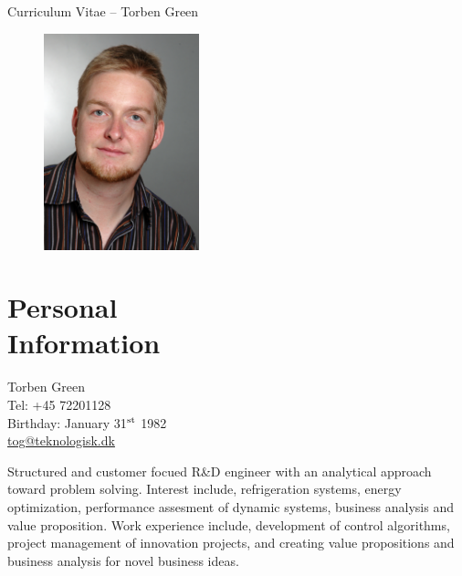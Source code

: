 \documentclass[margin,line,a4paper]{resume}
\begin{document}
{\sc \Large Curriculum Vitae -- Torben Green}
\begin{resume}
    \vspace{0.5cm}
    \begin{figure}
      \vspace{-1cm}
      \begin{center}
        \includegraphics[width=0.4\textwidth]{me}
      \end{center}
      \vspace{-1cm}
    \end{figure}

    \section{\mysidestyle Personal\\Information}%
    Torben Green \\
    Tel: +45 72201128 \\
    Birthday: January 31$^{\rm st}$ 1982\\
    \href{mailto:tog@teknologisk.dk}{tog@teknologisk.dk}

Structured and customer focued R\&D engineer with an analytical approach toward problem solving. Interest include, refrigeration systems, energy optimization, performance assesment of dynamic systems, business analysis and value proposition. Work experience include, development of control algorithms, project management of innovation projects, and creating value propositions and business analysis for novel business ideas.


\end{resume}
\end{document}
